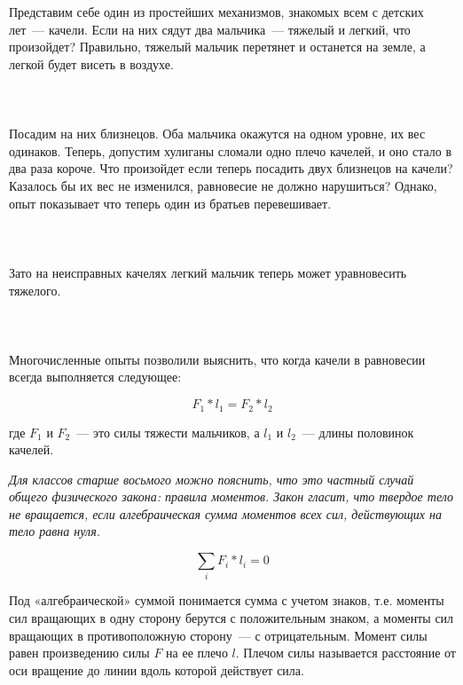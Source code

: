 Представим себе один из простейших механизмов, знакомых всем с детских лет~--- качели. Если на них сядут два мальчика~--- тяжелый и легкий, что произойдет? Правильно, тяжелый мальчик перетянет и останется на земле, а легкой будет висеть в воздухе.\\\\

\\\\

Посадим на них близнецов. Оба мальчика окажутся на одном уровне, их вес одинаков. Теперь, допустим хулиганы сломали одно плечо качелей, и оно стало в два раза короче. Что произойдет если теперь посадить двух близнецов на качели?  Казалось бы их вес не изменился, равновесие не должно нарушиться? Однако, опыт показывает что теперь один из братьев перевешивает.\\\\

\\\\

Зато на неисправных качелях легкий мальчик теперь может уравновесить тяжелого.\\\\

\\\\

Многочисленные опыты позволили выяснить, что когда качели в равновесии всегда выполняется следующее:

\begin{equation}
F_1*l_1=F_2*l_2
\end{equation}		

где \(F_1\) и \(F_2\)~--- это силы тяжести мальчиков, а \(l_1\) и \(l_2\)~--- длины половинок качелей.

{\slshape Для классов старше восьмого можно пояснить, что это частный случай общего физического закона: правила моментов. Закон гласит, что твердое тело не вращается, если алгебраическая сумма моментов всех сил, действующих на тело равна нуля.
	
	\begin{equation}
	\sum_i{F_i*l_i}=0
	\end{equation}		
	
	Под «алгебраической» суммой понимается сумма с учетом знаков, т.е. моменты сил вращающих в одну сторону берутся с положительным знаком, а моменты сил вращающих в противоположную сторону~--- с отрицательным. Момент силы равен произведению силы \(F\) на ее плечо \(l\). Плечом силы называется расстояние от оси вращение до линии вдоль которой действует сила.}

